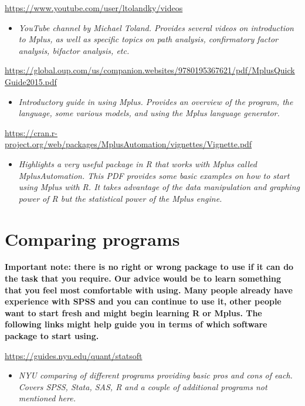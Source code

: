 \documentclass[
]{book}
\providecommand{\tightlist}{%
  \setlength{\itemsep}{0pt}\setlength{\parskip}{0pt}}
\begin{document}
\url{https://www.youtube.com/user/ltolandky/videos}

\begin{itemize}
\tightlist
\item
  \emph{YouTube channel by Michael Toland. Provides several videos on introduction to Mplus, as well as specific topics on path analysis, confirmatory factor analysis, bifactor analysis, etc.}
\end{itemize}

\url{https://global.oup.com/us/companion.websites/9780195367621/pdf/MplusQuickGuide2015.pdf}

\begin{itemize}
\tightlist
\item
  \emph{Introductory guide in using Mplus. Provides an overview of the program, the language, some various models, and using the Mplus language generator.}
\end{itemize}

\url{https://cran.r-project.org/web/packages/MplusAutomation/vignettes/Vignette.pdf}

\begin{itemize}
\tightlist
\item
  \emph{Highlights a very useful package in R that works with Mplus called MplusAutomation. This PDF provides some basic examples on how to start using Mplus with R. It takes advantage of the data manipulation and graphing power of R but the statistical power of the Mplus engine.}
\end{itemize}

\hypertarget{comparing-programs}{%
\section{Comparing programs}\label{comparing-programs}}

\textbf{Important note: there is no right or wrong package to use if it can do the task that you require. Our advice would be to learn something that you feel most comfortable with using. Many people already have experience with SPSS and you can continue to use it, other people want to start fresh and might begin learning R or Mplus. The following links might help guide you in terms of which software package to start using. }

\url{https://guides.nyu.edu/quant/statsoft}

\begin{itemize}
\tightlist
\item
  \emph{NYU comparing of different programs providing basic pros and cons of each. Covers SPSS, Stata, SAS, R and a couple of additional programs not mentioned here.}
\end{itemize}
\end{document}
